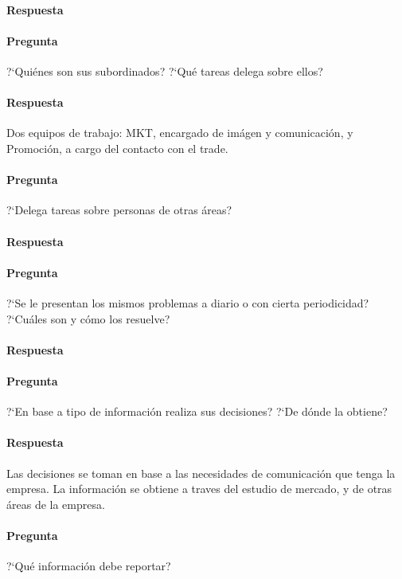 \documentclass[12pt,a4paper,spanish]{article}
\begin{document}
	\paragraph{Respuesta}

	\paragraph{Pregunta}
	 ?`Qui\'enes son sus subordinados?  ?`Qu\'e tareas delega sobre ellos?
	\paragraph{Respuesta}
	Dos equipos de trabajo: MKT, encargado de im\'agen y comunicaci\'on, y Promoci\'on, a cargo del contacto con el trade.

	\paragraph{Pregunta}
	 ?`Delega tareas sobre personas de otras \'areas?
	\paragraph{Respuesta}

	\paragraph{Pregunta}
	 ?`Se le presentan los mismos problemas a diario o con cierta periodicidad?  ?`Cu\'ales son y c\'omo los resuelve?
	\paragraph{Respuesta}

	\paragraph{Pregunta}
	 ?`En base a tipo de informaci\'on realiza sus decisiones?  ?`De d\'onde la obtiene?
	\paragraph{Respuesta}
	Las decisiones se toman en base a las necesidades de comunicaci\'on que tenga la empresa. La informaci\'on se obtiene a traves del estudio de mercado, y de otras \'areas de la empresa.
	
	\paragraph{Pregunta}
	 ?`Qu\'e informaci\'on debe reportar?
\end{document}
